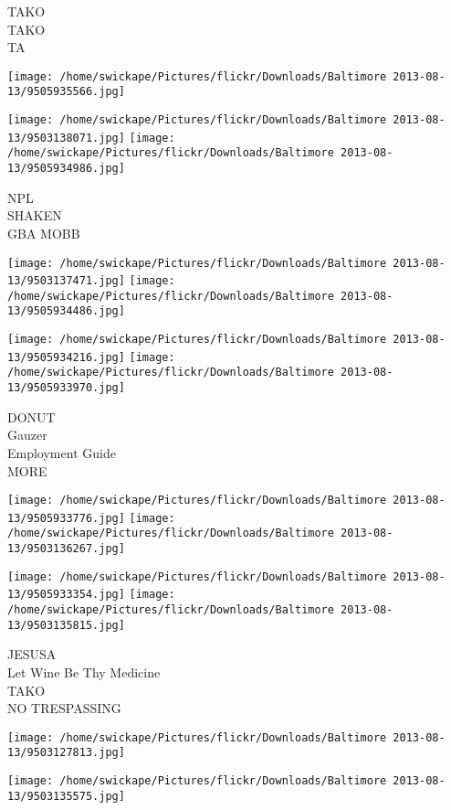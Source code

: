 \documentclass[10pt,letterpaper]{article}
\begin{document}
TAKO\\
TAKO\\
TA
\pagebreak

\texttt{[image: /home/swickape/Pictures/flickr/Downloads/Baltimore 2013-08-13/9505935566.jpg]}

\vspace{0.25in}
\texttt{[image: /home/swickape/Pictures/flickr/Downloads/Baltimore 2013-08-13/9503138071.jpg]}
\texttt{[image: /home/swickape/Pictures/flickr/Downloads/Baltimore 2013-08-13/9505934986.jpg]}

NPL\\
SHAKEN\\
GBA MOBB
\pagebreak

\texttt{[image: /home/swickape/Pictures/flickr/Downloads/Baltimore 2013-08-13/9503137471.jpg]}
\texttt{[image: /home/swickape/Pictures/flickr/Downloads/Baltimore 2013-08-13/9505934486.jpg]}

\texttt{[image: /home/swickape/Pictures/flickr/Downloads/Baltimore 2013-08-13/9505934216.jpg]}
\texttt{[image: /home/swickape/Pictures/flickr/Downloads/Baltimore 2013-08-13/9505933970.jpg]}

DONUT\\
Gauzer\\
Employment Guide\\
MORE
\pagebreak

\texttt{[image: /home/swickape/Pictures/flickr/Downloads/Baltimore 2013-08-13/9505933776.jpg]}
\texttt{[image: /home/swickape/Pictures/flickr/Downloads/Baltimore 2013-08-13/9503136267.jpg]}

\texttt{[image: /home/swickape/Pictures/flickr/Downloads/Baltimore 2013-08-13/9505933354.jpg]}
\texttt{[image: /home/swickape/Pictures/flickr/Downloads/Baltimore 2013-08-13/9503135815.jpg]}

JESUSA\\
Let Wine Be Thy Medicine\\
TAKO\\
NO TRESPASSING
\pagebreak

\texttt{[image: /home/swickape/Pictures/flickr/Downloads/Baltimore 2013-08-13/9503127813.jpg]}

\vspace{0.25in}
\texttt{[image: /home/swickape/Pictures/flickr/Downloads/Baltimore 2013-08-13/9503135575.jpg]}
\end{document}
